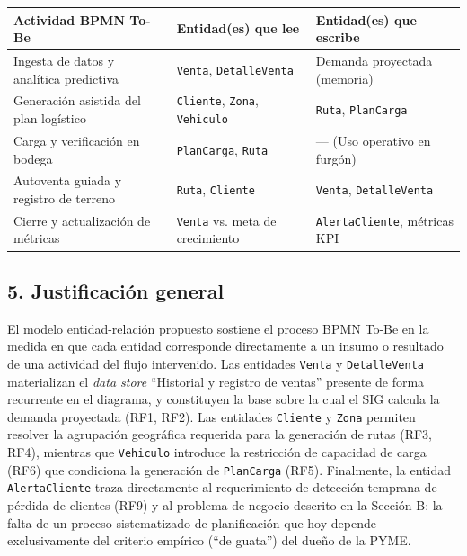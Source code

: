 \documentclass[10pt,a4paper]{article}
\begin{document}
\vspace{0.15cm}
\begin{center}
\small
\renewcommand{\arraystretch}{1.25}
\begin{tabular}{|p{5.4cm}|p{4.4cm}|p{5.0cm}|}
\hline
\textbf{Actividad BPMN To-Be} & \textbf{Entidad(es) que lee} & \textbf{Entidad(es) que escribe} \\ \hline
Ingesta de datos y analítica predictiva & \texttt{Venta}, \texttt{DetalleVenta} & Demanda proyectada (memoria) \\ \hline
Generación asistida del plan logístico & \texttt{Cliente}, \texttt{Zona}, \texttt{Vehiculo} & \texttt{Ruta}, \texttt{PlanCarga} \\ \hline
Carga y verificación en bodega & \texttt{PlanCarga}, \texttt{Ruta} & --- (Uso operativo en furgón) \\ \hline
Autoventa guiada y registro de terreno & \texttt{Ruta}, \texttt{Cliente} & \texttt{Venta}, \texttt{DetalleVenta} \\ \hline
Cierre y actualización de métricas & \texttt{Venta} vs. meta de crecimiento & \texttt{AlertaCliente}, métricas KPI \\ \hline
\end{tabular}
\end{center}
\vspace{0.2cm}

\subsection*{5. Justificación general}

El modelo entidad-relación propuesto sostiene el proceso BPMN To-Be en la medida
en que cada entidad corresponde directamente a un insumo o resultado de una
actividad del flujo intervenido. Las entidades \texttt{Venta} y
\texttt{DetalleVenta} materializan el \textit{data store} ``Historial y registro
de ventas'' presente de forma recurrente en el diagrama, y constituyen la base
sobre la cual el SIG calcula la demanda proyectada (RF1, RF2). Las entidades
\texttt{Cliente} y \texttt{Zona} permiten resolver la agrupación geográfica
requerida para la generación de rutas (RF3, RF4), mientras que
\texttt{Vehiculo} introduce la restricción de capacidad de carga (RF6) que
condiciona la generación de \texttt{PlanCarga} (RF5). Finalmente, la entidad
\texttt{AlertaCliente} traza directamente al requerimiento de detección temprana
de pérdida de clientes (RF9) y al problema de negocio descrito en la Sección B:
la falta de un proceso sistematizado de planificación que hoy depende
exclusivamente del criterio empírico (``de guata'') del dueño de la PYME.
\end{document}

